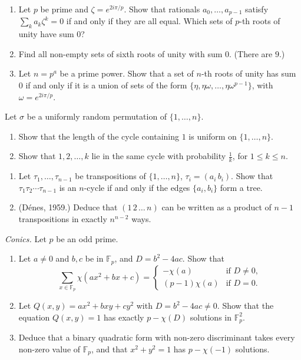 \begin{exercise}[$\star\star$]\label{pb:vanish}
\begin{enumerate}[label=(\alph*)]
\item Let $p$ be prime and $\zeta=e^{2i\pi/p}$. Show that rationals $a_0,\dots,a_{p-1}$ satisfy $\sum_ka_k\zeta^k=0$ if and
only if they are all equal. Which sets of $p$-th roots of unity have sum $0$?
\item Find all non-empty sets of sixth roots of unity with sum $0$. (There are $9$.)
\item Let $n=p^a$ be a prime power. Show that a set of $n$-th roots of unity has sum $0$ if and only if it is a union of
sets of the form $\{\eta,\eta\omega,\dots,\eta\omega^{p-1}\}$, with $\omega=e^{2i\pi/p}$.
\end{enumerate}
\end{exercise}

\begin{exercise}[$\star$]\label{pb:samecycle}
Let $\sigma$ be a uniformly random permutation of $\{1,\dots,n\}$.
\begin{enumerate}[label=(\alph*)]
\item Show that the length of the cycle containing $1$ is uniform on $\{1,\dots,n\}$.
\item Show that $1,2,\dots,k$ lie in the same cycle with probability $\frac1k$, for $1\le k\le n$.
\end{enumerate}
\end{exercise}

\begin{exercise}[$\star\star$]\label{pb:denes}
\begin{enumerate}[label=(\alph*)]
\item Let $\tau_1,\dots,\tau_{n-1}$ be transpositions of $\{1,\dots,n\}$, $\tau_i=(a_i\,b_i)$. Show that $\tau_1\tau_2\cdots\tau_{n-1}$ is an
$n$-cycle if and only if the edges $\{a_i,b_i\}$ form a tree.
\item (Dénes, 1959.) Deduce that $(1\,2\,\dots\,n)$ can be written as a product of $n-1$ transpositions in exactly $n^{n-2}$
ways.
\end{enumerate}
\end{exercise}

\begin{exercise}[$\star$]\label{pb:conics}
\emph{Conics.} Let $p$ be an odd prime.
\begin{enumerate}[label=(\alph*)]
\item Let $a\ne0$ and $b,c$ be in $\mathbb F_p$, and $D=b^2-4ac$. Show that
\[
\sum_{x\in\mathbb F_p}\chi(ax^2+bx+c)=\begin{cases}-\chi(a)&\text{if }D\ne0,\\(p-1)\chi(a)&\text{if }D=0.\end{cases}
\]
\item Let $Q(x,y)=ax^2+bxy+cy^2$ with $D=b^2-4ac\ne0$. Show that the equation $Q(x,y)=1$ has exactly $p-\chi(D)$ solutions in
$\mathbb F_p^2$.
\item Deduce that a binary quadratic form with non-zero discriminant takes every non-zero value of $\mathbb F_p$, and that
$x^2+y^2=1$ has $p-\chi(-1)$ solutions.
\end{enumerate}
\end{exercise}

